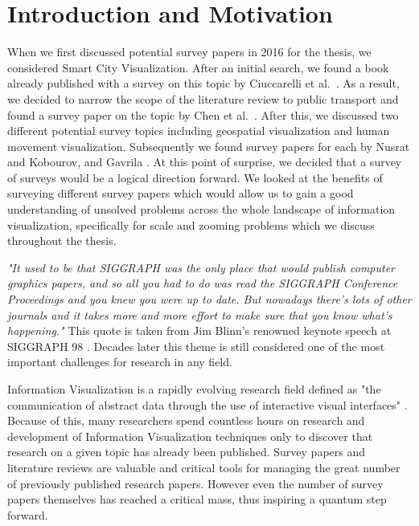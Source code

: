 \section{Introduction and Motivation}
When we first discussed potential survey papers in 2016 for the thesis, we considered Smart City Visualization. After an initial search, we found a book already published with a survey on this topic by Ciuccarelli et al.\ \cite{ciuccarelli2014depicting}. As a result, we decided to narrow the scope of the literature review to public transport and found a survey paper on the topic by Chen et al.\ \cite{chen2015survey}. After this, we discussed two different potential survey topics including geospatial visualization and human movement visualization. Subsequently we found survey papers for each by Nusrat and Kobourov, and Gavrila \cite{nusrat2016state,gavrila1999visual}. At this point of surprise, we decided that a survey of surveys would be a logical direction forward. We looked at the benefits of surveying different survey papers which would allow us to gain a good understanding of unsolved problems across the whole landscape of information visualization, specifically for scale and zooming problems which we discuss throughout the thesis.


\textit{"It used to be that SIGGRAPH was the only place that would publish computer graphics papers, and so all you had to do was read the SIGGRAPH Conference Proceedings and you knew you were up to date. But nowadays there's lots of other journals and it takes more and more effort to make sure that you know what's happening."} This quote is taken from Jim Blinn's renowned keynote speech at SIGGRAPH 98 \cite{blinn1998ten}. Decades later this theme is still considered one of the most important challenges for research in any field.

 Information Visualization is a rapidly evolving research field defined as "the communication of abstract data through the use of interactive visual interfaces" \cite{keim2006challenges}. Because of this, many researchers spend countless hours on research and development of Information Visualization techniques only to discover that research on a given topic has already been published. Survey papers and literature reviews are valuable and critical tools for managing the great number of previously published research papers. However even the number of survey papers themselves has reached a critical mass, thus inspiring a quantum step forward.

